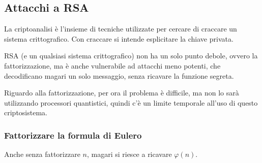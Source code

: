 \subsection{Attacchi a RSA}

La criptoanalisi è l'insieme di tecniche utilizzate per cercare di craccare un sistema crittografico.
Con craccare si intende esplicitare la chiave privata.

RSA (e un qualsiasi sistema crittografico) non ha un solo punto debole, ovvero la fattorizzazione, ma è anche vulnerabile ad attacchi meno potenti, che decodificano magari un solo messaggio, senza ricavare la funzione segreta.

Riguardo alla fattorizzazione, per ora il problema è difficile, ma non lo sarà utilizzando processori quantistici, quindi c'è un limite temporale all'uso di questo criptosistema.

\subsubsection{Fattorizzare la formula di Eulero}

Anche senza fattorizzare $n$, magari si riesce a ricavare $\varphi(n)$.

